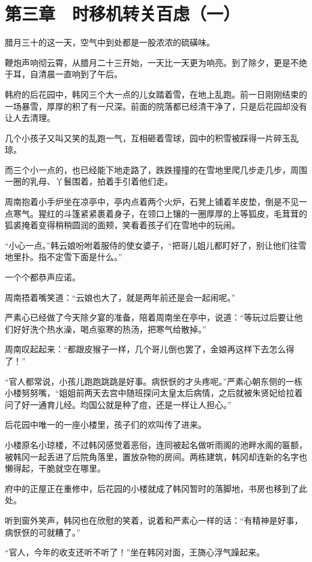 \section{第三章　时移机转关百虑（一）}

腊月三十的这一天，空气中到处都是一股浓浓的硫磺味。

鞭炮声响彻云霄，从腊月二十三开始，一天比一天更为响亮。到了除夕，更是不绝于耳，自清晨一直响到了午后。

韩府的后花园中，韩冈三个大一点的儿女踏着雪，在地上乱跑。前一日刚刚结束的一场暴雪，厚厚的积了有一尺深。前面的院落都已经清干净了，只是后花园却没有让人去清理。

几个小孩子又叫又笑的乱跑一气，互相砸着雪球，园中的积雪被踩得一片碎玉乱琼。

而三个小一点的，也已经能下地走路了，跌跌撞撞的在雪地里爬几步走几步，周围一圈的乳母、丫鬟围着，拍着手引着他们走。

周南抱着小手炉坐在凉亭中，亭内点着两个火炉，石凳上铺着羊皮垫，倒是不见一点寒气。猩红的斗篷紧紧裹着身子，在领口上镶的一圈厚厚的上等狐皮，毛茸茸的狐裘掩着变得稍稍圆润的面颊，笑看着孩子们在雪地中的玩闹。

“小心一点。”韩云娘吩咐着服侍的使女婆子，“把哥儿姐儿都盯好了，别让他们往雪地里扑。指不定雪下面是什么。”

一个个都恭声应诺。

周南捂着嘴笑道：“云娘也大了，就是两年前还是会一起闹呢。”

严素心已经做了今天除夕宴的准备，陪着周南坐在亭中，说道：“等玩过后要让他们好好洗个热水澡，喝点驱寒的热汤，把寒气给散掉。”

周南叹起起来：“都跟皮猴子一样，几个哥儿倒也罢了，金娘再这样下去怎么得了！”

“官人都常说，小孩儿跑跑跳跳是好事。病恹恹的才头疼呢。”严素心朝东侧的一栋小楼努努嘴，“姐姐前两天去宫中随班探问太皇太后病情，之后就被朱贤妃给拉着问了好一通育儿经。均国公就是种了痘，还是一样让人担心。”

后花园中唯一的一座小楼里，孩子们的欢叫传了进来。

小楼原名小琼楼，不过韩冈感觉着恶俗，连同被起名做听雨阁的池畔水阁的匾额，被韩冈一起丢进了后院角落里，置放杂物的房间。两栋建筑，韩冈却连新的名字也懒得起，干脆就空在哪里。

府中的正屋正在重修中，后花园的小楼就成了韩冈暂时的落脚地，书房也移到了此处。

听到窗外笑声，韩冈也在欣慰的笑着，说着和严素心一样的话：“有精神是好事，病恹恹的可就糟了。”

“官人，今年的收支还听不听了！”坐在韩冈对面，王旖心浮气躁起来。

